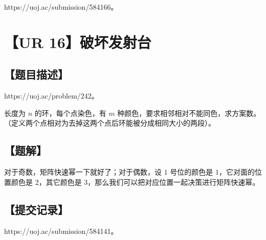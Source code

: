 \documentclass[UTF8,12pt,a4paper]{ctexart}
\begin{document}
	https://uoj.ac/submission/584166。
	
	
	\section*{【UR 16】破坏发射台}
	
	\subsection*{【题目描述】}
	
	https://uoj.ac/problem/242。
	
	长度为 $n$ 的环，每个点染色，有 $m$ 种颜色，要求相邻相对不能同色，求方案数。（定义两个点相对为去掉这两个点后环能被分成相同大小的两段）。
	
	\subsection*{【题解】}
	
	对于奇数，矩阵快速幂一下就好了；对于偶数，设 $1$ 号位的颜色是 $1$，它对面的位置颜色是 $2$，其它颜色是 $3$，那么我们可以把对应位置一起决策进行矩阵快速幂。
	
	\subsection*{【提交记录】}
	
	https://uoj.ac/submission/584141。
	
\end{document}
